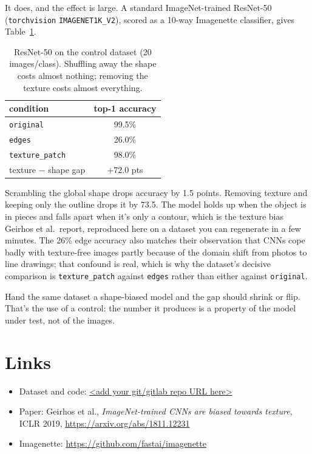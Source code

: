 \documentclass[11pt]{article}
\begin{document}
It does, and the effect is large. A standard ImageNet-trained ResNet-50
(\texttt{torchvision} \texttt{IMAGENET1K\_V2}), scored as a 10-way Imagenette
classifier, gives Table~\ref{tab:results}.

\begin{table}[h]
  \centering
  \begin{tabular}{lc}
    \toprule
    condition & top-1 accuracy \\
    \midrule
    \texttt{original}      & 99.5\% \\
    \texttt{edges}         & 26.0\% \\
    \texttt{texture\_patch} & 98.0\% \\
    \midrule
    texture $-$ shape gap  & $+72.0$ pts \\
    \bottomrule
  \end{tabular}
  \caption{ResNet-50 on the control dataset (20 images/class). Shuffling away the
  shape costs almost nothing; removing the texture costs almost everything.}
  \label{tab:results}
\end{table}

Scrambling the global shape drops accuracy by 1.5 points. Removing texture and
keeping only the outline drops it by 73.5. The model holds up when the object is
in pieces and falls apart when it's only a contour, which is the texture bias
Geirhos et al.\ report, reproduced here on a dataset you can regenerate in a few
minutes. The 26\% edge accuracy also matches their observation that CNNs cope
badly with texture-free images partly because of the domain shift from photos to
line drawings; that confound is real, which is why the dataset's decisive
comparison is \texttt{texture\_patch} against \texttt{edges} rather than either
against \texttt{original}.

Hand the same dataset a shape-biased model and the gap should shrink or flip.
That's the use of a control: the number it produces is a property of the model
under test, not of the images.

\section{Links}

\begin{itemize}
  \item Dataset and code: \url{<add your git/gitlab repo URL here>}
  \item Paper: Geirhos et al., \emph{ImageNet-trained CNNs are biased towards
        texture}, ICLR 2019, \url{https://arxiv.org/abs/1811.12231}
  \item Imagenette: \url{https://github.com/fastai/imagenette}
\end{itemize}
\end{document}
